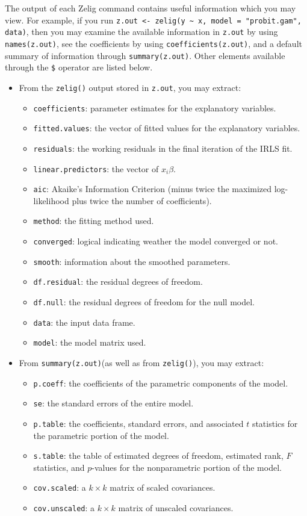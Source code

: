 The output of each Zelig command contains useful information which you may view. For example, if you run {\tt z.out <- zelig(y \~{} x, model = "probit.gam", data)}, then you may examine the available information in {\tt z.out} by using {\tt names(z.out)}, see the coefficients by using {\tt coefficients(z.out)}, and a default summary of information through {\tt summary(z.out)}. Other elements available through the {\tt \$} operator are listed below. 
\begin{itemize}
\item From the {\tt zelig()} output stored in {\tt  z.out}, you may extract:
\begin{itemize}
\item {\tt coefficients}: parameter estimates for the explanatory variables.
\item {\tt fitted.values}: the vector of fitted values for the explanatory variables.
\item {\tt residuals}: the working residuals in the final iteration of the IRLS fit. 
\item {\tt linear.predictors}: the vector of $x_{i}\beta$.
\item {\tt aic}: Akaike's Information Criterion (minus twice the maximized log-likelihood plus twice the number of coefficients).
\item {\tt method}: the fitting method used.
\item {\tt converged}: logical indicating weather the model converged or not.
\item {\tt smooth}: information about the smoothed parameters.
\item {\tt df.residual}: the residual degrees of freedom.
\item {\tt df.null}: the residual degrees of freedom for the null model. 
\item {\tt data}: the input data frame. 
\item {\tt model}: the model matrix used.


\end{itemize}
\item From {\tt summary(z.out)}(as well as from {\tt zelig()}), you may extract:
\begin{itemize}
\item {\tt p.coeff}: the coefficients of the parametric components of the model. 
\item {\tt se}: the standard errors of the entire model. 
\item {\tt p.table}: the coefficients, standard errors, and associated $t$ statistics for the parametric portion of the model. 
\item {\tt s.table}: the table of estimated degrees of freedom, estimated rank, $F$ statistics, and $p$-values for the nonparametric portion of the model. 
\item {\tt cov.scaled}: a $k \times k$ matrix of scaled covariances.
\item {\tt cov.unscaled}: a $k \times k$ matrix of unscaled covariances. 
\end{itemize}



\end{itemize}

